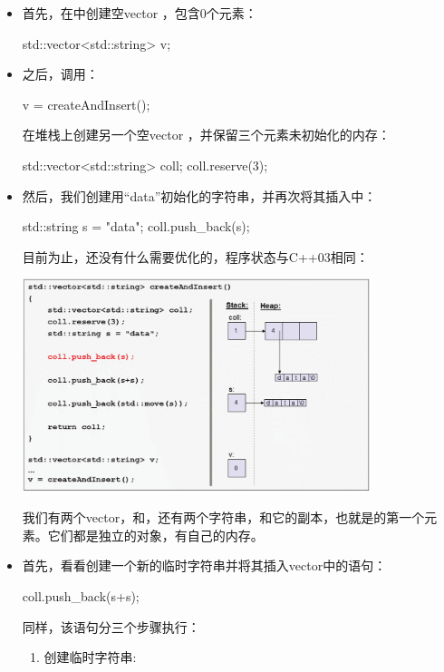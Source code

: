 \begin{itemize}
	\item 首先，在中创建空vector ，包含0个元素：
	\begin{cppcode}
std::vector<std::string> v;
	\end{cppcode}
	\item 之后，调用：
\begin{cppcode}
v = createAndInsert();
\end{cppcode}
	在堆栈上创建另一个空vector ，并保留三个元素未初始化的内存：
\begin{cppcode}
std::vector<std::string> coll;
coll.reserve(3);
\end{cppcode}
	\item 然后，我们创建用“data”初始化的字符串，并再次将其插入中：
\begin{cppcode}
std::string s = "data";
coll.push_back(s);
\end{cppcode}
	目前为止，还没有什么需要优化的，程序状态与C++03相同：
\begin{center}
		\includegraphics[width=0.8\textwidth]{part1/ch1/images/10}
	\end{center}
	我们有两个vector，和，还有两个字符串，和它的副本，也就是的第一个元素。它们都是独立的对象，有自己的内存。

	\item 首先，看看创建一个新的临时字符串并将其插入vector中的语句：
\begin{cppcode}
coll.push_back(s+s);
\end{cppcode}
	同样，该语句分三个步骤执行：

	\begin{enumerate}
		\item 创建临时字符串:


\end{enumerate}
\end{itemize}

